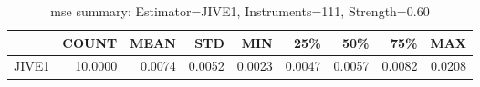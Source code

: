 \begin{table}[ht]
\centering
\caption{mse summary: Estimator=JIVE1, Instruments=111, Strength=0.60}
\begin{tabular}{lrrrrrrrr}
\toprule
 & COUNT & MEAN & STD & MIN & 25\% & 50\% & 75\% & MAX \\
\midrule
JIVE1 & 10.0000 & 0.0074 & 0.0052 & 0.0023 & 0.0047 & 0.0057 & 0.0082 & 0.0208 \\
\bottomrule
\end{tabular}
\end{table}
